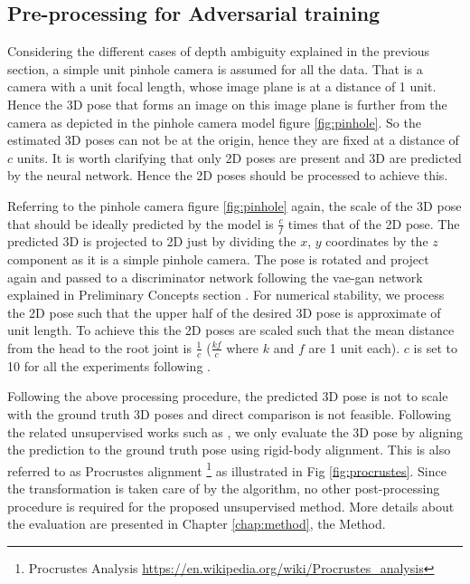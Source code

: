 \subsection{Pre-processing for Adversarial training}
Considering the different cases of depth ambiguity explained in the previous section, a simple unit pinhole camera is assumed for all the data. That is a camera with a unit focal length, whose image plane is at a distance of 1 unit. Hence the 3D pose that forms an image on this image plane is further from the camera as depicted in the pinhole camera model figure \ref{fig:pinhole}. So the estimated 3D poses can not be at the origin, hence they are fixed at a distance of $c$ units. It is worth clarifying that only 2D poses are present and 3D are predicted by the neural network. Hence the 2D poses should be processed to achieve this. 

Referring to the pinhole camera figure \ref{fig:pinhole} again, the scale of the 3D pose that should be ideally predicted by the model is $\frac{c}{f}$ times that of the 2D pose. The predicted 3D is projected to 2D just by dividing the $x$, $y$ coordinates by the $z$ component as it is a simple pinhole camera. The pose is rotated and project again and passed to a discriminator network following the \ac{vae}-\ac{gan} network explained in Preliminary Concepts section . For numerical stability, we process the 2D pose such that the upper half of the desired 3D pose is approximate of unit length. To achieve this the 2D poses are scaled such that the mean distance from the head to the root joint is $\frac{1}{c}$ ($\frac{k f}{c}$ where $k$ and $f$ are 1 unit each). $c$ is set to 10 for all the experiments following \cite{amazon1}.

Following the above processing procedure, the predicted 3D pose is not to scale with the ground truth 3D poses and direct comparison is not feasible. Following the related unsupervised works such as \cite{amazon1}, we only evaluate the 3D pose by aligning the prediction to the ground truth pose using rigid-body alignment. This is also referred to as Procrustes alignment \footnote{Procrustes Analysis \url{https://en.wikipedia.org/wiki/Procrustes_analysis}} as illustrated in Fig \ref{fig:procrustes}. Since the transformation is taken care of by the algorithm, no other post-processing procedure is required for the proposed unsupervised method. More details about the evaluation are presented in Chapter \ref{chap:method}, the Method.



